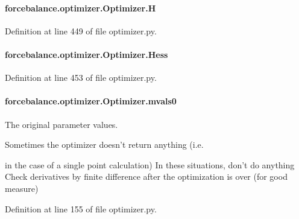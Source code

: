 \hypertarget{classforcebalance_1_1optimizer_1_1Optimizer_a7cf404b3b15afec4237344f09a31b6c7}{
\paragraph[{H}]{\setlength{\rightskip}{0pt plus 5cm}forcebalance.\-optimizer.\-Optimizer.\-H}}\label{classforcebalance_1_1optimizer_1_1Optimizer_a7cf404b3b15afec4237344f09a31b6c7}


Definition at line 449 of file optimizer.\-py.

\hypertarget{classforcebalance_1_1optimizer_1_1Optimizer_ab99276420d1c28932d2559c7f8e88922}{
\paragraph[{Hess}]{\setlength{\rightskip}{0pt plus 5cm}forcebalance.\-optimizer.\-Optimizer.\-Hess}}\label{classforcebalance_1_1optimizer_1_1Optimizer_ab99276420d1c28932d2559c7f8e88922}


Definition at line 453 of file optimizer.\-py.

\hypertarget{classforcebalance_1_1optimizer_1_1Optimizer_aa1d7f33ea1c9341fb1c867ef01752a16}{
\paragraph[{mvals0}]{\setlength{\rightskip}{0pt plus 5cm}forcebalance.\-optimizer.\-Optimizer.\-mvals0}}\label{classforcebalance_1_1optimizer_1_1Optimizer_aa1d7f33ea1c9341fb1c867ef01752a16}


The original parameter values. 

Sometimes the optimizer doesn't return anything (i.\-e.

in the case of a single point calculation) In these situations, don't do anything Check derivatives by finite difference after the optimization is over (for good measure) 

Definition at line 155 of file optimizer.\-py.

